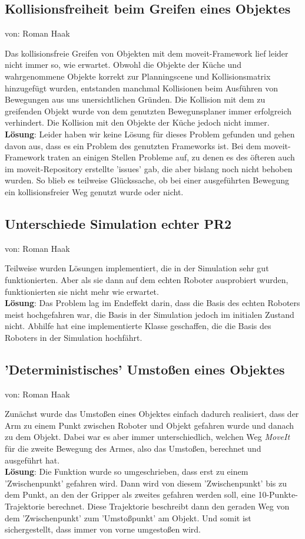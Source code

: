 \documentclass{suturo}
\makeatletter
\newcommand{\chapterauthor}[1]{%
  {\parindent0pt\vspace*{-27pt}%
  \linespread{0}\small\begin{flushright}von: #1\end{flushright}%
  \par\nobreak\vspace*{0pt}}
  \@afterheading%
}
\makeatother
\begin{document}
\subsection{Kollisionsfreiheit beim Greifen eines Objektes}
\chapterauthor{Roman Haak}
Das kollisionsfreie Greifen von Objekten mit dem moveit-Framework lief leider nicht immer so, wie erwartet. Obwohl die Objekte der Küche und wahrgenommene Objekte korrekt zur Planningscene und Kollisionsmatrix hinzugefügt wurden, entstanden manchmal Kollisionen beim Ausführen von Bewegungen aus uns unersichtlichen Gründen. Die Kollision mit dem zu greifenden Objekt wurde von dem genutzten Bewegunsplaner immer erfolgreich verhindert. Die Kollision mit den Objekte der Küche jedoch nicht immer.\\
\textbf{Lösung}: Leider haben wir keine Lösung für dieses Problem gefunden und gehen davon aus, dass es ein Problem des genutzten Frameworks ist. Bei dem moveit-Framework traten an einigen Stellen Probleme auf, zu denen es des öfteren auch im moveit-Repository erstellte 'issues' gab, die aber bislang noch nicht behoben wurden. So blieb es teilweise Glückssache, ob bei einer ausgeführten Bewegung ein kollisionsfreier Weg genutzt wurde oder nicht.

\subsection{Unterschiede Simulation echter PR2}
\chapterauthor{Roman Haak}
Teilweise wurden Lösungen implementiert, die in der Simulation sehr gut funktionierten. Aber als sie dann auf dem echten Roboter ausprobiert wurden,
funktionierten sie nicht mehr wie erwartet.\\
\textbf{Lösung}: Das Problem lag im Endeffekt darin, dass die Basis des echten Roboters meist hochgefahren war, die Basis in der Simulation jedoch im initialen Zustand nicht. Abhilfe hat eine implementierte Klasse geschaffen, die die Basis des Roboters in der Simulation hochfährt.

\subsection{'Deterministisches' Umstoßen eines Objektes}
\chapterauthor{Roman Haak}
Zunächst wurde das Umstoßen eines Objektes einfach dadurch realisiert, dass der Arm zu einem Punkt zwischen Roboter und Objekt gefahren wurde und danach zu dem Objekt. Dabei war es aber immer unterschiedlich, welchen Weg \textit{MoveIt} für die zweite Bewegung des Armes, also das Umstoßen, berechnet und ausgeführt hat.\\
\textbf{Lösung}: Die Funktion wurde so umgeschrieben, dass erst zu einem 'Zwischenpunkt' gefahren wird. Dann wird von diesem 'Zwischenpunkt' bis zu dem Punkt, an den der Gripper als zweites gefahren werden soll, eine 10-Punkte-Trajektorie berechnet. Diese Trajektorie beschreibt dann den geraden Weg von dem 'Zwischenpunkt' zum 'Umstoßpunkt' am Objekt. Und somit ist sichergestellt, dass immer von vorne umgestoßen wird.
\end{document}
